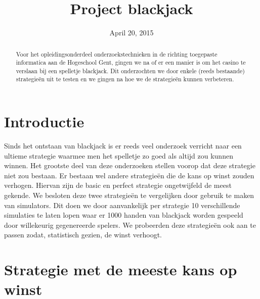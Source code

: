 \documentclass[conference]{IEEEtran}
\begin{document}
\title{Project blackjack}

\author{
}
\date{April 20, 2015}


\maketitle

\begin{abstract}
Voor het opleidingsonderdeel onderzoekstechnieken in de richting toegepaste informatica aan de Hogeschool Gent, gingen we na of er een manier is om het casino te verslaan bij een spelletje blackjack. Dit onderzochten we door enkele (reeds bestaande) strategie\"{e}n uit te testen en we gingen na hoe we de strategie\"{e}n kunnen verbeteren.
\end{abstract}

\IEEEpeerreviewmaketitle

\section{Introductie}
Sinds het ontstaan van blackjack is er reeds veel onderzoek verricht naar een ultieme strategie waarmee men het spelletje zo goed als altijd zou kunnen winnen. Het grootste deel van deze onderzoeken stellen voorop dat deze strategie niet zou bestaan. Er bestaan wel andere strategie\"{e}n die de kans op winst zouden verhogen. Hiervan zijn de basic en perfect strategie ongetwijfeld de meest gekende. We besloten deze twee strategie\"{e}n te vergelijken door gebruik te maken van simulators. Dit doen we door aanvankelijk per strategie 10 verschillende simulaties te laten lopen waar er 1000 handen van blackjack worden gespeeld door willekeurig gegenereerde spelers. We probeerden deze strategie\"{e}n ook aan te passen zodat, statistisch gezien, de winst verhoogt. 

\section{Strategie met de meeste kans op winst}
\end{document}

